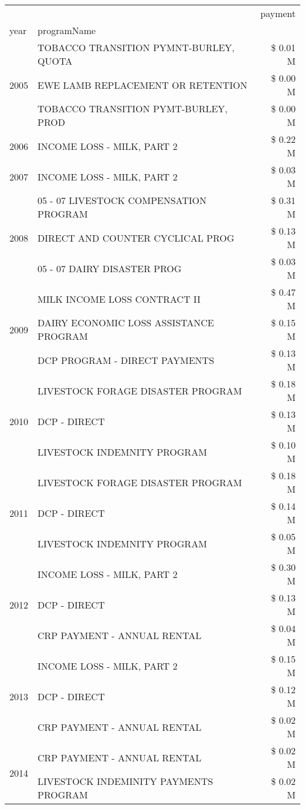 \begin{tabular}{llr}
\toprule
 &  & payment \\
year & programName &  \\
\midrule
\multirow[t]{3}{*}{2005} & TOBACCO TRANSITION PYMNT-BURLEY, QUOTA & \$ 0.01 M \\
 & EWE LAMB REPLACEMENT OR RETENTION & \$ 0.00 M \\
 & TOBACCO TRANSITION PYMT-BURLEY, PROD & \$ 0.00 M \\
\cline{1-3}
2006 & INCOME LOSS - MILK, PART 2 & \$ 0.22 M \\
\cline{1-3}
2007 & INCOME LOSS - MILK, PART 2 & \$ 0.03 M \\
\cline{1-3}
\multirow[t]{3}{*}{2008} & 05 - 07 LIVESTOCK COMPENSATION PROGRAM & \$ 0.31 M \\
 & DIRECT AND COUNTER CYCLICAL PROG & \$ 0.13 M \\
 & 05 - 07 DAIRY DISASTER PROG & \$ 0.03 M \\
\cline{1-3}
\multirow[t]{3}{*}{2009} & MILK INCOME LOSS CONTRACT II & \$ 0.47 M \\
 & DAIRY ECONOMIC LOSS ASSISTANCE PROGRAM & \$ 0.15 M \\
 & DCP PROGRAM - DIRECT PAYMENTS & \$ 0.13 M \\
\cline{1-3}
\multirow[t]{3}{*}{2010} & LIVESTOCK FORAGE DISASTER PROGRAM & \$ 0.18 M \\
 & DCP - DIRECT & \$ 0.13 M \\
 & LIVESTOCK INDEMNITY PROGRAM & \$ 0.10 M \\
\cline{1-3}
\multirow[t]{3}{*}{2011} & LIVESTOCK FORAGE DISASTER PROGRAM & \$ 0.18 M \\
 & DCP - DIRECT & \$ 0.14 M \\
 & LIVESTOCK INDEMNITY PROGRAM & \$ 0.05 M \\
\cline{1-3}
\multirow[t]{3}{*}{2012} & INCOME LOSS - MILK, PART 2 & \$ 0.30 M \\
 & DCP - DIRECT & \$ 0.13 M \\
 & CRP PAYMENT - ANNUAL RENTAL & \$ 0.04 M \\
\cline{1-3}
\multirow[t]{3}{*}{2013} & INCOME LOSS - MILK, PART 2 & \$ 0.15 M \\
 & DCP - DIRECT & \$ 0.12 M \\
 & CRP PAYMENT - ANNUAL RENTAL & \$ 0.02 M \\
\cline{1-3}
\multirow[t]{3}{*}{2014} & CRP PAYMENT - ANNUAL RENTAL & \$ 0.02 M \\
 & LIVESTOCK INDEMINITY PAYMENTS PROGRAM & \$ 0.02 M \\

\end{tabular}
